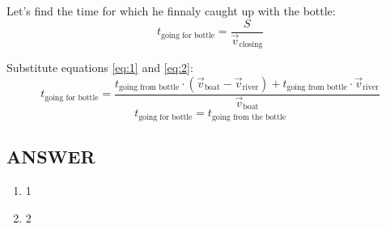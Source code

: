 Let's find the time for which he finnaly caught up with the bottle:
$$t_{\text{going for bottle}} = \frac{S}{\Vec{v}_\text{closing}}$$

Substitute equations \eqref{eq:1} and \eqref{eq:2}:
$$t_{\text{going for bottle}} = \frac{t_{\text{going from bottle}} \cdot (\Vec{v}_{\text{boat}} - \Vec{v}_{\text{river}}) + t_{\text{going from bottle}} \cdot \Vec{v}_{\text{river}}}{\Vec{v}_{\text{boat}}}$$ 
$$t_{\text{going for bottle}} = t_\text{going from the bottle}$$



\vfill
\subsection*{ANSWER}
\begin{enumerate}
    \item 1
    \item 2
\end{enumerate}

